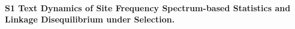 \documentclass[10pt,letterpaper]{article}
\renewcommand{\figurename}{Fig}
\begin{document}
\linenumbers








\newpage


\clearpage


\clearpage
%
\setcounter{figure}{0}
\setcounter{table}{0}
\setcounter{equation}{0}
\renewcommand{\figurename}{}
\renewcommand{\tablename}{}
\renewcommand{\thefigure}{S\arabic{figure} Fig}
\renewcommand{\thetable}{S\arabic{table} Table}
\renewcommand{\theequation}{S\arabic{equation}}




\paragraph{S1 Text Dynamics of Site Frequency Spectrum-based Statistics and Linkage 
	Disequilibrium under Selection.}
\nolinenumbers
\end{document}
